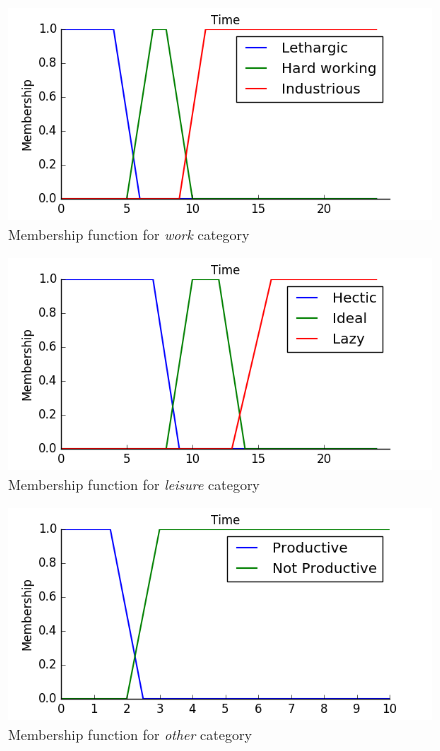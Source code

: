 \documentclass[conference]{IEEEtran}
\begin{document}
\begin{figure}[h!]
\centering
\captionsetup{justification=centering}
\noindent \includegraphics[scale=0.35]{work}
\caption{Membership function for \textit{work} category}
\end{figure}
\begin{figure}[h!]
\centering
\captionsetup{justification=centering}
\noindent \includegraphics[scale=0.35]{leisure}
\caption{Membership function for \textit{leisure} category}
\end{figure}
\begin{figure}[h!]
\centering
\captionsetup{justification=centering}
\noindent \includegraphics[scale=0.35]{other}
\caption{Membership function for \textit{other} category}
\end{figure}
\end{document}

